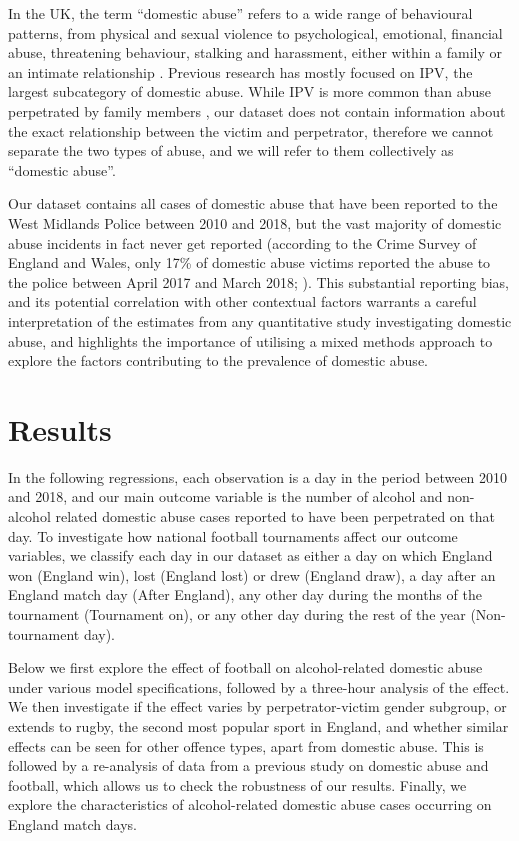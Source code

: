 \documentclass[12pt, a4paper]{article}
\begin{document}
In the UK, the term ``domestic abuse'' refers to a wide range of behavioural patterns, from physical and sexual violence to psychological, emotional, financial abuse, threatening behaviour, stalking and harassment, either within a family or an intimate relationship \citep{ONS}. Previous research has mostly focused on IPV, the largest subcategory of domestic abuse. While IPV is more common than abuse perpetrated by family members \citep{ONS}, our dataset does not contain information about the exact relationship between the victim and perpetrator, therefore we cannot separate the two types of abuse, and we will refer to them collectively as ``domestic abuse''.


Our dataset contains all cases of domestic abuse that have been reported to the West Midlands Police between 2010 and 2018, but the vast majority of domestic abuse incidents in fact never get reported (according to the Crime Survey of England and Wales, only 17\% of domestic abuse victims reported the abuse to the police between April 2017 and March 2018; \citealt{ONS}). This substantial reporting bias, and its potential correlation with other contextual factors warrants a careful interpretation of the estimates from any quantitative study investigating domestic abuse, and highlights the importance of utilising a mixed methods approach to explore the factors contributing to the prevalence of domestic abuse. 

\section*{Results}

In the following regressions, each observation is a day in the period between 2010 and 2018, and our main outcome variable is the number of alcohol and non-alcohol related domestic abuse cases reported to have been perpetrated on that day. To investigate how national football tournaments affect our outcome variables, we classify each day in our dataset as either a day on which England won (England win), lost (England lost) or drew (England draw), a day after an England match day (After England), any other day during the months of the tournament (Tournament on), or any other day during the rest of the year (Non-tournament day). 

Below we first explore the effect of football on alcohol-related domestic abuse under various model specifications, followed by a three-hour analysis of the effect. We then investigate if the effect varies by perpetrator-victim gender subgroup, or extends to rugby, the second most popular sport in England, and whether similar effects can be seen for other offence types, apart from domestic abuse. This is followed by a re-analysis of data from a previous study on domestic abuse and football, which allows us to check the robustness of our results. Finally, we explore the characteristics of alcohol-related domestic abuse cases occurring on England match days.
\end{document}
